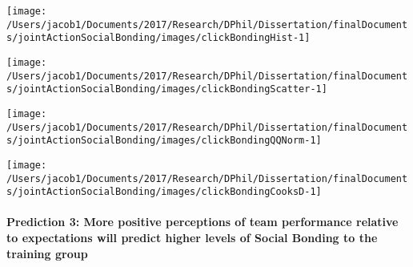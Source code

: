 \documentclass[english]{article}\usepackage[]{graphicx}\usepackage[]{color}
\makeatletter
\def\maxwidth{ %
  \ifdim\Gin@nat@width>\linewidth
    \linewidth
  \else
    \Gin@nat@width
  \fi
}
\newenvironment{knitrout}{}{} %
\newcommand{\myparagraph}[1]{\paragraph{#1}\mbox{}\\}
\makeatother
\begin{document}
\begin{knitrout}
\color{fgcolor}

{\centering \texttt{[image: /Users/jacob1/Documents/2017/Research/DPhil/Dissertation/finalDocuments/jointActionSocialBonding/images/clickBondingHist-1]} 

}



\end{knitrout}
\begin{knitrout}
\color{fgcolor}

{\centering \texttt{[image: /Users/jacob1/Documents/2017/Research/DPhil/Dissertation/finalDocuments/jointActionSocialBonding/images/clickBondingScatter-1]} 

}



\end{knitrout}
\begin{knitrout}
\color{fgcolor}

{\centering \texttt{[image: /Users/jacob1/Documents/2017/Research/DPhil/Dissertation/finalDocuments/jointActionSocialBonding/images/clickBondingQQNorm-1]} 

}



\end{knitrout}
\begin{knitrout}
\color{fgcolor}

{\centering \texttt{[image: /Users/jacob1/Documents/2017/Research/DPhil/Dissertation/finalDocuments/jointActionSocialBonding/images/clickBondingCooksD-1]} 

}



\end{knitrout}




















\myparagraph{Prediction 3: More positive perceptions of team performance relative to expectations will predict higher levels of Social Bonding to the training group}
\end{document}
